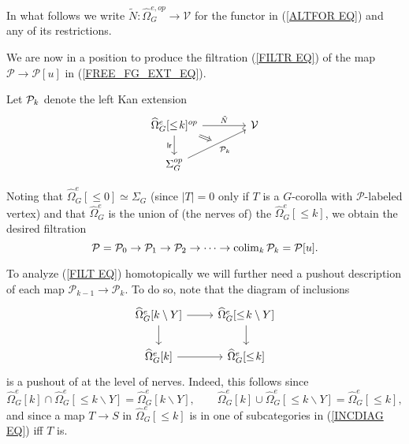 \documentclass[a4paper,10pt]{article}%
\begin{document}
In what follows we write $\tilde{N} \colon \widehat{\Omega}_G^{e,op} \to \mathcal{V}$ for the functor in (\ref{ALTFOR EQ}) and any of its restrictions.

We are now in a position to produce the filtration (\ref{FILTR EQ})
of the map $\mathcal{P} \to \mathcal{P}[u]$
in (\ref{FREE_FG_EXT_EQ}).

\begin{definition} \label{PK_DEFN}
  Let $\P_k$ denote the left Kan extension
\[
\begin{tikzcd}[column sep =4em]
	|[alias=U]| \widehat{\Omega}_G^e[\leq\! k]^{op} \arrow[r, "\tilde{N}"] \arrow[d, "\mathsf{lr}"'] & \V
\\
	\Sigma_G^{op} \arrow[ur, "\P_k"', ""{name=V}]
	\arrow[Rightarrow, from=U, to=V]
\end{tikzcd}
\]
\end{definition}
Noting that $\widehat{\Omega}_G^e[\leq\! 0] \simeq \Sigma_G$
(since $|T|=0$ only if $T$ is a $G$-corolla with $\mathcal{P}$-labeled vertex)
and that $\widehat{\Omega}_G^e$
is the union of (the nerves of) the 
$\widehat{\Omega}_G^e[\leq\! k]$,
we obtain the desired filtration
\begin{equation}\label{FILT EQ}
	\mathcal{P} = 
	\mathcal{P}_0 \to 
	\mathcal{P}_1 \to
	\mathcal{P}_2 \to
	\cdots \to 
	\colim_k \mathcal{P}_k = \mathcal{P}[u].
\end{equation}

To analyze (\ref{FILT EQ}) homotopically we will further need a pushout description of each map 
$\mathcal{P}_{k-1} \to \mathcal{P}_k$. To do so,  note that the diagram of inclusions
\begin{equation}\label{INCDIAG EQ}
\begin{tikzcd}
	\widehat{\Omega}_G^{e}[k \mathbin{\backslash} Y]
	\arrow[d] \arrow[r] &
	\widehat{\Omega}_G^{e}[\leq\! k \mathbin{\backslash} Y]
	\arrow[d]
\\
	\widehat{\Omega}_G^e[k] \arrow[r] &
	\widehat{\Omega}_G^e[\leq\! k]
\end{tikzcd}
\end{equation}
is a pushout of at the level of nerves.
Indeed, this follows since
\[
	\widehat{\Omega}_G^e[k] \cap
	\widehat{\Omega}_G^{e}[\leq\! k \mathbin{\backslash} Y]
	= \widehat{\Omega}_G^{e}[k \mathbin{\backslash} Y],
\qquad
	\widehat{\Omega}_G^e[k] \cup 
	\widehat{\Omega}_G^{e}[\leq\! k\mathbin{\backslash} Y]
	= \widehat{\Omega}_G^{e}[\leq\! k],
\]
and since a map $T \to S$ in 
$\widehat{\Omega}_G^e[\leq\! k]$ is in one of subcategories in (\ref{INCDIAG EQ}) iff $T$ is.
\end{document}
